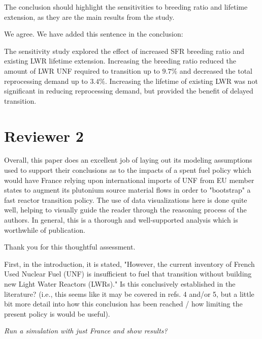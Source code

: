 \documentclass[answers,11pt]{exam}
\begin{document}
\begin{questions}
        \question The conclusion should highlight the sensitivities to breeding 
        ratio and lifetime extension, as they are the main results from the 
        study.  

        \begin{solution}
                We agree. We have added this sentence in the conclusion:
                
                The sensitivity study explored the effect of increased SFR breeding
                ratio and existing LWR lifetime extension. Increasing the breeding
                ratio reduced the amount of LWR UNF required to transition
                up to $9.7\%$ and decreased the total reprocessing demand up to $3.4\%$.
                Increasing the lifetime of existing LWR was not significant
                in reducing reprocessing demand, but provided the benefit of delayed
                transition.
        \end{solution}


        \section*{Reviewer 2}


        \question Overall, this paper does an excellent job of laying out its 
        modeling assumptions used to support their conclusions as to the 
        impacts of a spent fuel policy which would have France relying upon 
        international imports of UNF from EU member states to augment its 
        plutonium source material flows in order to "bootstrap" a fast reactor 
        transition policy. The use of data visualizations here is done quite 
        well, helping to visually guide the reader through the reasoning 
        process of the authors. In general, this is a thorough and 
        well-supported analysis which is worthwhile of publication.


        \begin{solution}
                Thank you for this thoughtful assessment.
        \end{solution}

        \question First, in the introduction, it is stated, "However, the 
        current inventory of French Used Nuclear Fuel (UNF) is insufficient to 
        fuel that transition without building new Light Water Reactors (LWRs)." 
        Is this conclusively established in the literature? (i.e., this seems 
        like it may be covered in refs. 4 and/or 5, but a little bit more 
        detail into how this conclusion has been reached / how limiting the 
        present policy is would be useful).
        \begin{solution}
                \textit{Run a simulation with just France and show results?}
                

\end{solution}
\end{questions}
\end{document}
